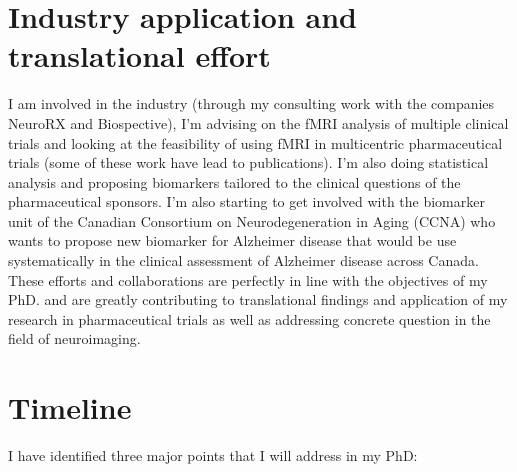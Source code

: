 \section{Industry application and translational effort}
I am involved in the industry (through my consulting work with the companies NeuroRX and Biospective), I'm advising on the fMRI analysis of multiple clinical trials and looking at the feasibility of using fMRI in multicentric pharmaceutical trials (some of these work have lead to publications). I'm also doing statistical analysis and proposing biomarkers tailored to the clinical questions of the pharmaceutical sponsors. I'm also starting to get involved with the biomarker unit of the Canadian Consortium on Neurodegeneration in Aging (CCNA) who wants to propose new biomarker for Alzheimer disease that would be use systematically in the clinical assessment of Alzheimer disease across Canada. These efforts and collaborations are perfectly in line with the objectives of my PhD. and are greatly contributing to translational findings and application of my research in pharmaceutical trials as well as addressing concrete question in the field of neuroimaging.

\section{Timeline}
I have identified three major points that I will address in my PhD:

